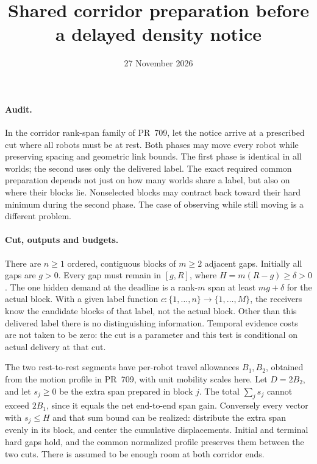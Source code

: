 \documentclass[11pt]{article}
\title{Shared corridor preparation before a delayed density notice}
\date{27 November 2026}
\begin{document}
\maketitle
\paragraph{Audit.}
In the corridor rank-span family of PR~709, let the notice arrive
at a prescribed cut where all robots must be at rest. Both phases
may move every robot while preserving spacing and geometric
link bounds. The first phase is identical in all worlds; the
second uses only the delivered label. The exact required common
preparation depends not just on how many worlds share a label, but
also on where their blocks lie. Nonselected blocks may contract
back toward their hard minimum during the second phase.
The case of observing while still moving is a different problem.

\paragraph{Cut, outputs and budgets.}
There are \(n\ge1\) ordered, contiguous blocks of \(m\ge2\)
adjacent gaps. Initially all gaps are \(g>0\). Every gap must
remain in \([g,R]\), where \(H=m(R-g)\ge\delta>0\). The one hidden
demand at the deadline is a rank-\(m\) span at least
\(mg+\delta\) for the actual block. With a given label function
\(c:\{1,\ldots,n\}\to\{1,\ldots,M\}\), the receivers know the
candidate blocks of that label, not the actual block.
Other than this delivered label there is no distinguishing
information. Temporal evidence costs are not taken to be zero:
the cut is a parameter and this test is conditional on actual
delivery at that cut.

The two rest-to-rest segments have per-robot travel allowances
\(B_1,B_2\), obtained from the motion profile in PR~709, with
unit mobility scales here. Let \(D=2B_2\), and let \(s_j\ge0\)
be the extra span prepared in block \(j\). The total
\(\sum_j s_j\) cannot exceed \(2B_1\), since it equals the net
end-to-end span gain. Conversely every vector with
\(s_j\le H\) and that sum bound can be realized: distribute the
extra span evenly in its block, and center the cumulative
displacements. Initial and terminal hard gaps hold, and the
common normalized profile preserves them between the two cuts.
There is assumed to be enough room at both corridor ends.
\end{document}
